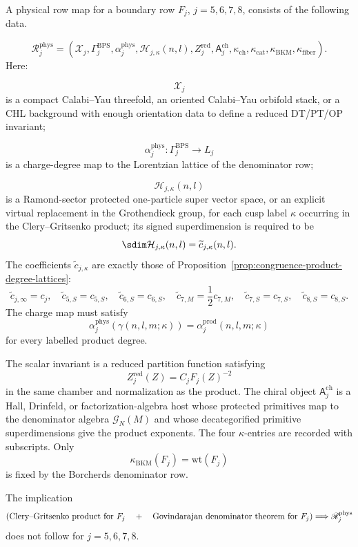 \begin{definition}
A physical row map for a boundary row $F_j$, $j=5,6,7,8$, consists of
the following data.

\[
\mathscr R_j^{\mathrm{phys}}=
\left(
\mathcal X_j,\Gamma_j^{\mathrm{BPS}},
\alpha_j^{\mathrm{phys}},
\mathcal H_{j,\kappa}(n,l),
Z_j^{\mathrm{red}},
\mathsf A_j^{\mathrm{ch}},
\kappa_{\mathrm{ch}},\kappa_{\mathrm{cat}},\kappa_{\mathrm{BKM}},
\kappa_{\mathrm{fiber}}
\right).
\]
Here:

\[
\mathcal X_j
\]
is a compact Calabi--Yau threefold, an oriented Calabi--Yau orbifold
stack, or a CHL background with enough orientation data to define a
reduced DT/PT/OP invariant;

\[
\alpha_j^{\mathrm{phys}}:\Gamma_j^{\mathrm{BPS}}\longrightarrow L_j
\]
is a charge-degree map to the Lorentzian lattice of the denominator
row;

\[
\mathcal H_{j,\kappa}(n,l)
\]
is a Ramond-sector protected one-particle super vector space, or an
explicit virtual replacement in the Grothendieck group, for each cusp
label $\kappa$ occurring in the Clery--Gritsenko product; its signed
superdimension is required to be
$$
\sdim \mathcal H_{j,\kappa}(n,l)=\widetilde c_{j,\kappa}(n,l).
$$
The coefficients $\widetilde c_{j,\kappa}$ are exactly those of
Proposition~\ref{prop:congruence-product-degree-lattices}:
$$
\widetilde c_{j,\infty}=c_j,\quad
\widetilde c_{5,S}=c_{5,S},\quad
\widetilde c_{6,S}=c_{6,S},\quad
\widetilde c_{7,M}=\frac12c_{7,M},\quad
\widetilde c_{7,S}=c_{7,S},\quad
\widetilde c_{8,S}=c_{8,S}.
$$
The charge map must satisfy
$$
\alpha_j^{\mathrm{phys}}(\gamma(n,l,m;\kappa))
=\alpha_j^{\mathrm{prod}}(n,l,m;\kappa)
$$
for every labelled product degree.

The scalar invariant is a reduced partition function satisfying
$$
Z_j^{\mathrm{red}}(Z)=C_jF_j(Z)^{-2}
$$
in the same chamber and normalization as the product.  The chiral object
$\mathsf A_j^{\mathrm{ch}}$ is a Hall, Drinfeld, or factorization-algebra
host whose protected primitives map to the denominator algebra
$\mathcal G_N(M)$ and whose decategorified primitive superdimensions
give the product exponents.  The four $\kappa$-entries are recorded with
subscripts.  Only
$$
\kappa_{\mathrm{BKM}}(F_j)=\mathrm{wt}(F_j)
$$
is fixed by the Borcherds denominator row.
\end{definition}

\begin{theorem}
The implication
$$
\left(
\hbox{Clery--Gritsenko product for }F_j
\quad+\quad
\hbox{Govindarajan denominator theorem for }F_j
\right)
\Longrightarrow
\mathscr R_j^{\mathrm{phys}}
$$
does not follow for $j=5,6,7,8$.
\end{theorem}

